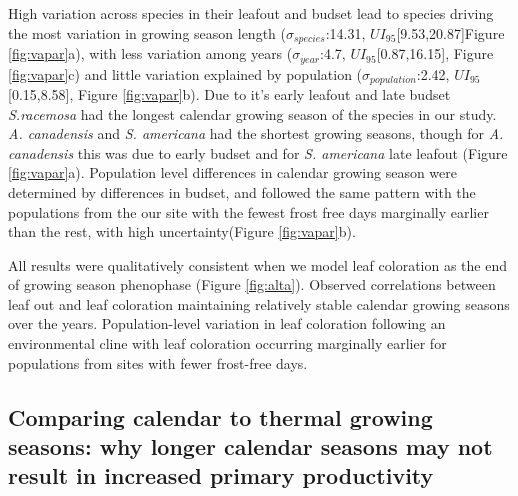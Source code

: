 \documentclass{article}[12pt]
\begin{document}
High variation across species in their leafout and budset lead to species driving the most variation in growing season length  ($\sigma_{species}$:14.31, $UI_{95}$[9.53,20.87]Figure \ref{fig:vapar}a), with less variation among years ($\sigma_{year}$:4.7, $UI_{95}$[0.87,16.15], Figure \ref{fig:vapar}c) and little variation explained by population ($\sigma_{population}$:2.42, $UI_{95}$[0.15,8.58], Figure \ref{fig:vapar}b). Due to it's early leafout and late budset \emph{S.racemosa} had the longest calendar growing season of the species in our study. %
\emph{A. canadensis} and \emph{S. americana} had the shortest growing seasons, though for \emph{A. canadensis} this was due to early budset and for \emph{S. americana} late leafout (Figure \ref{fig:vapar}a). %
Population level differences in calendar growing season were determined by differences in budset, and followed the same pattern with the populations from the our site with the fewest frost free days marginally earlier than the rest, with high uncertainty(Figure \ref{fig:vapar}b).

All results were qualitatively consistent when we model leaf coloration as the end of growing season phenophase (Figure \ref{fig:alta}). Observed correlations between leaf out and leaf coloration maintaining relatively stable calendar growing seasons over the years. Population-level variation in leaf coloration following an environmental cline with leaf coloration occurring marginally earlier for populations from sites with fewer frost-free days.

\subsection{Comparing calendar to thermal growing seasons: why longer calendar seasons may not result in increased primary productivity}
\end{document}
